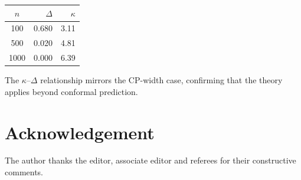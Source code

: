 \documentclass[lineno]{biometrika}
\begin{document}
\begin{table}[h!]
{\begin{tabular}{crr}
$n$ & $\Delta$ & $\kappa$ \\ \hline
100 & 0.680 & 3.11 \\
500 & 0.020 & 4.81 \\
1000 & 0.000 & 6.39
\end{tabular}}
\end{table}

The $\kappa$--$\Delta$ relationship mirrors the CP-width case, confirming that the theory applies beyond conformal prediction.

\section*{Acknowledgement}
The author thanks the editor, associate editor and referees for their constructive comments.



\end{document}
